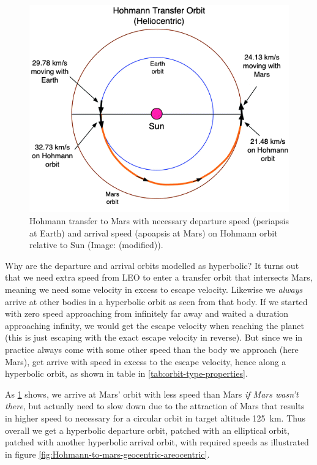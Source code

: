 \begin{figure}[ht]
    \centering
    \includegraphics[width=0.7\linewidth]{fig/Hohmann-to-mars-heliocentric.png}
    \caption{Hohmann transfer to Mars with necessary departure speed (periapsis at Earth) and arrival speed (apoapsis at Mars) on Hohmann orbit relative to Sun (Image: \cite[p.~127]{Rapp2016} (modified)).}
    \label{fig:Hohmann-to-mars-heliocentric}
\end{figure}


Why are the departure and arrival orbits modelled as hyperbolic? It turns out that we need extra speed from LEO to enter a transfer orbit that intersects Mars, meaning we need some velocity in excess to escape velocity. Likewise we \emph{always} arrive at other bodies in a hyperbolic orbit as seen from that body. If we started with zero speed approaching from infinitely far away and waited a duration approaching infinity, we would get the escape velocity when reaching the planet (this is just escaping with the exact escape velocity in reverse). But since we in practice always come with some other speed than the body we approach (here Mars), get arrive with speed in excess to the escape velocity, hence along a hyperbolic orbit, as shown in table in \cref{tab:orbit-type-properties}.

As \cref{fig:Hohmann-to-mars-heliocentric} shows, we arrive at Mars' orbit with less speed than Mars \emph{if Mars wasn't there}, but actually need to slow down due to the attraction of Mars that results in higher speed to necessary for a circular orbit in target altitude \SI{125}{\km}. Thus overall we get a hyperbolic departure orbit, patched with an elliptical orbit, patched with another hyperbolic arrival orbit, with required speeds as illustrated in figure \cref{fig:Hohmann-to-mars-geocentric-areocentric}.

